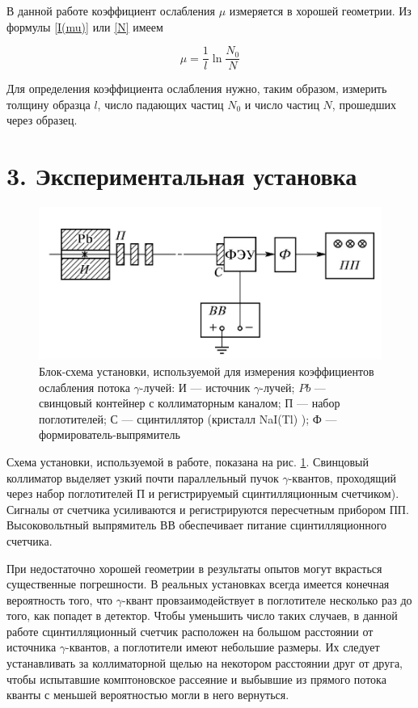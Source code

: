 \documentclass[a4paper,12pt]{report}
\begin{document}
	В данной работе коэффициент ослабления $ \mu $ измеряется в хорошей
	геометрии. Из формулы \eqref{I(mu)} или \eqref{N} имеем
	
	\begin{equation}\label{mu}
	\mu = \dfrac{1}{l} \ln{\dfrac{N_0}{N}}
	\end{equation}
	
	Для определения коэффициента ослабления нужно, таким образом, измерить толщину образца $ l $, число падающих частиц $ N_0 $ и число
	частиц $ N $, прошедших через образец.

\section*{3. Экспериментальная установка}
\begin{figure}[h!]
		\centering
		\includegraphics[width=0.7\linewidth]{4.jpg}
		\caption{Блок-схема установки, используемой для измерения коэффициентов ослабления потока $\gamma$-лучей: И --- источник $\gamma$-лучей; $ Pb $ --- свинцовый контейнер с коллиматорным каналом; П --- набор поглотителей; С --- сцинтиллятор (кристалл
			NaI(Tl) ); Ф --- формирователь-выпрямитель}
		\label{ris lab}
	\end{figure}

Схема установки, используемой в работе, показана на рис. \ref{ris lab}. Свинцовый коллиматор выделяет узкий почти параллельный пучок $\gamma$-квантов, проходящий через набор поглотителей П и регистрируемый сцинтилляционным счетчиком). Сигналы от счетчика усиливаются и регистрируются пересчетным прибором ПП. Высоковольтный выпрямитель ВВ обеспечивает питание сцинтилляционного счетчика.

При недостаточно хорошей геометрии в результаты опытов могут
вкрасться существенные погрешности. В реальных установках всегда имеется конечная вероятность того, что $\gamma$-квант провзаимодействует в
поглотителе несколько раз до того, как попадет в детектор. Чтобы уменьшить число таких случаев, в данной работе сцинтилляционный счетчик расположен на большом расстоянии от источника $\gamma$-квантов, а поглотители имеют небольшие размеры. Их следует устанавливать за коллиматорной щелью на некотором расстоянии друг от друга, чтобы испытавшие комптоновское рассеяние и выбывшие из прямого потока кванты с меньшей вероятностью могли в него вернуться.
\end{document}

